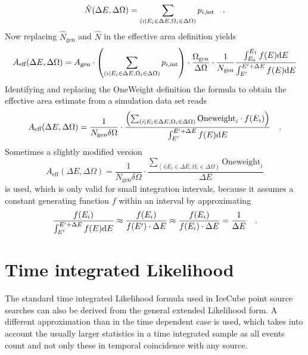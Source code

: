 \begin{equation}
  \hat{N}(\Delta E, \Delta \Omega) =
  \sum_{(i|E_i\in\Delta E, \Omega_i\in\Delta\Omega)} p_{i,\text{int}}
  \quad\text{.}
\end{equation}
Now replacing $\hat{N}_\text{gen}$ and $\hat{N}$ in the effective area definition yields
\begin{equation}
  A_\text{eff}(\Delta E, \Delta \Omega) =
    A_\text{gen} \cdot
    \left(\sum_{(i|E_i\in\Delta E, \Omega_i\in\Delta\Omega)}
          p_{i,\text{int}}\right) \cdot
    \frac{\Omega_\text{gen}}{\Delta\Omega} \cdot \frac{1}{N_\text{gen}}
    \frac{\int_{E_0}^{E_1} f(E) \mathrm{d}E}
         {\int_{E'}^{E'+\Delta E} f(E) \mathrm{d}E}
\end{equation}
Identifying and replacing the OneWeight definition the formula to obtain the effective area estimate from a simulation data set reads
\begin{equation}
  A_\text{eff}(\Delta E, \Delta \Omega) =
    \frac{1}{N_\text{gen}\delta\Omega}\cdot
    \frac{\left(
            \sum_{(i|E_i\in\Delta E, \Omega_i\in\Delta\Omega)}
            \text{Oneweight}_i \cdot f(E_i)
          \right)}
          {\int_{E'}^{E'+\Delta E}f(E)\mathrm{d}E}
  \quad\text{.}
\end{equation}
Sometimes a slightly modified version
\begin{equation}
  A_\text{eff}(\Delta E, \Delta \Omega) =
    \frac{1}{N_\text{gen}\delta\Omega}\cdot
    \frac{\sum_{(i|E_i\in\Delta E, \Omega_i\in\Delta\Omega)}
          \text{Oneweight}_i}
         {\Delta E}
\end{equation}
is used, which is only valid for small integration intervals, because it assumes a constant generating function $f$ within an interval by approximating
\begin{equation}
  \frac{f(E_i)}{\int_{E'}^{E'+\Delta E}f(E)\mathrm{d}E}
  \approx \frac{f(E_i)}{f(E')\cdot\Delta E}
  \approx \frac{f(E_i)}{f(E_i)\cdot\Delta E}
  = \frac{1}{\Delta E}
  \quad\text{.}
\end{equation}


\section{Time integrated Likelihood}
The standard time integrated Likelihood formula used in IceCube point source searches can also be derived from the general extended Likelihood form.
A different approximation than in the time dependent case is used, which takes into account the usually larger statistics in a time integrated sample as all events count and not only these in temporal coincidence with any source.

